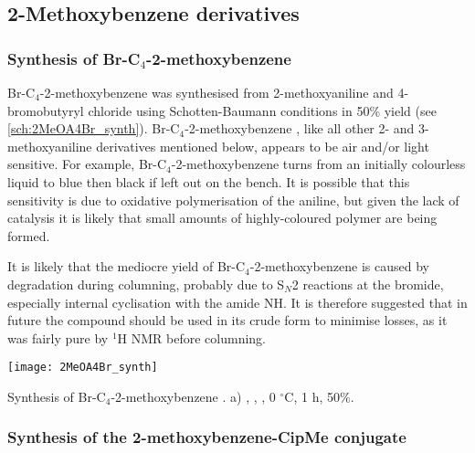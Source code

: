 
\subsection{2-Methoxybenzene derivatives\label{sec:2MeO}}

\subsubsection{Synthesis of Br-C$_4$-2-methoxybenzene }

Br-C$_4$-2-methoxybenzene  was synthesised from 2-methoxyaniline  and 4-bromobutyryl chloride  using Schotten-Baumann conditions in 50\% yield (see \ref{sch:2MeOA4Br_synth}). Br-C$_4$-2-methoxybenzene , like all other 2- and 3-methoxyaniline derivatives mentioned below, appears to be air and/or light sensitive.  For example, Br-C$_4$-2-methoxybenzene  turns from an initially colourless liquid to blue then black if left out on the bench. It is possible that this sensitivity is due to oxidative polymerisation of the aniline\cite{Mezhuev2017,Ragimov1997}, but given the lack of catalysis it is likely that small amounts of highly-coloured polymer are being formed.

It is likely that the mediocre yield of Br-C$_4$-2-methoxybenzene  is caused by degradation during columning, probably due to S$_N$2 reactions at the bromide, especially internal cyclisation with the amide NH. It is therefore suggested that in future the compound should be used in its crude form to minimise losses, as it was fairly pure by $^{1}$H NMR before columning.

\begin{scheme}[H]
	\begin{center}
		\texttt{[image: 2MeOA4Br\_synth]}
		\caption{Synthesis of Br-C$_4$-2-methoxybenzene .
		a) , , , 0 $^{\circ}$C, 1 h, 50\%.
		\label{sch:2MeOA4Br_synth}}
	\end{center}
\end{scheme}

\subsubsection{Synthesis of the 2-methoxybenzene-CipMe conjugate }

